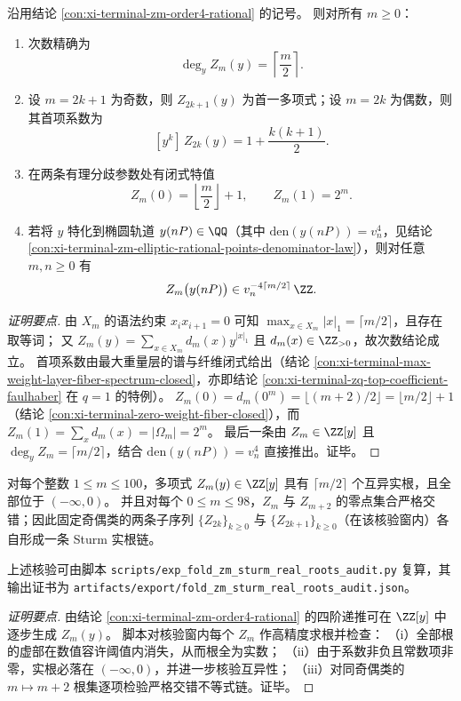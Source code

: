 \begin{conclusion}\label{con:xi-terminal-zm-degree-leading-special-values}
沿用结论 \ref{con:xi-terminal-zm-order4-rational} 的记号。
则对所有 \(m\ge 0\)：
\begin{enumerate}
  \item 次数精确为
  \[
  \deg_y Z_m(y)=\left\lceil\frac m2\right\rceil.
  \]
  \item 设 \(m=2k+1\) 为奇数，则 \(Z_{2k+1}(y)\) 为首一多项式；设 \(m=2k\) 为偶数，则其首项系数为
  \[
  [y^{k}]\,Z_{2k}(y)=1+\frac{k(k+1)}{2}.
  \]
  \item 在两条有理分歧参数处有闭式特值
  \[
  Z_m(0)=\left\lfloor\frac m2\right\rfloor+1,\qquad
  Z_m(1)=2^m.
  \]
  \item 若将 \(y\) 特化到椭圆轨道 \(y(nP)\in\QQ\)（其中 \(\mathrm{den}(y(nP))=v_n^4\)，见结论 \ref{con:xi-terminal-zm-elliptic-rational-points-denominator-law}），则对任意 \(m,n\ge 0\) 有
  \[
  Z_m\bigl(y(nP)\bigr)\in v_n^{-4\lceil m/2\rceil}\,\ZZ.
  \]
\end{enumerate}
\end{conclusion}
\begin{proof}[证明要点]
由 \(X_m\) 的语法约束 \(x_ix_{i+1}=0\) 可知 \(\max_{x\in X_m}|x|_1=\lceil m/2\rceil\)，且存在取等词；
又 \(Z_m(y)=\sum_{x\in X_m}d_m(x)y^{|x|_1}\) 且 \(d_m(x)\in\ZZ_{>0}\)，故次数结论成立。
首项系数由最大重量层的谱与纤维闭式给出（结论 \ref{con:xi-terminal-max-weight-layer-fiber-spectrum-closed}，亦即结论 \ref{con:xi-terminal-zq-top-coefficient-faulhaber} 在 \(q=1\) 的特例）。
\(Z_m(0)=d_m(0^m)=\lfloor(m+2)/2\rfloor=\lfloor m/2\rfloor+1\)（结论 \ref{con:xi-terminal-zero-weight-fiber-closed}），而 \(Z_m(1)=\sum_x d_m(x)=|\Omega_m|=2^m\)。
最后一条由 \(Z_m\in\ZZ[y]\) 且 \(\deg_y Z_m=\lceil m/2\rceil\)，结合 \(\mathrm{den}(y(nP))=v_n^4\) 直接推出。证毕。
\end{proof}

\begin{conclusion}[有限窗 Sturm 实根交错：\texorpdfstring{$m\le 100$}{m<=100} 时 \texorpdfstring{$Z_m(y)$}{Z_m(y)} 的负实根性]\label{con:xi-terminal-zm-sturm-real-roots-interlacing-m100}
对每个整数 \(1\le m\le 100\)，多项式 \(Z_m(y)\in\ZZ[y]\) 具有 \(\lceil m/2\rceil\) 个互异实根，且全部位于 \((-\infty,0)\)。
并且对每个 \(0\le m\le 98\)，\(Z_m\) 与 \(Z_{m+2}\) 的零点集合严格交错；因此固定奇偶类的两条子序列 \(\{Z_{2k}\}_{k\ge 0}\) 与 \(\{Z_{2k+1}\}_{k\ge 0}\)（在该核验窗内）各自形成一条 Sturm 实根链。
\par
上述核验可由脚本 \texttt{scripts/exp\_fold\_zm\_sturm\_real\_roots\_audit.py} 复算，其输出证书为 \texttt{artifacts/export/fold\_zm\_sturm\_real\_roots\_audit.json}。
\end{conclusion}
\begin{proof}[证明要点]
由结论 \ref{con:xi-terminal-zm-order4-rational} 的四阶递推可在 \(\ZZ[y]\) 中逐步生成 \(Z_m(y)\)。
脚本对核验窗内每个 \(Z_m\) 作高精度求根并检查：
（i）全部根的虚部在数值容许阈值内消失，从而根全为实数；
（ii）由于系数非负且常数项非零，实根必落在 \((-\infty,0)\)，并进一步核验互异性；
（iii）对同奇偶类的 \(m\mapsto m+2\) 根集逐项检验严格交错不等式链。证毕。
\end{proof}

